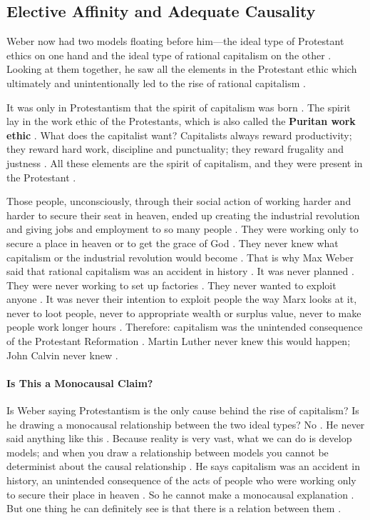 \subsection{Elective Affinity and Adequate Causality}
Weber now had two models floating before him---the ideal type of Protestant ethics on one hand and the ideal type of rational capitalism on the other . Looking at them together, he saw all the elements in the Protestant ethic which ultimately and unintentionally led to the rise of rational capitalism .

It was only in Protestantism that the spirit of capitalism was born . The spirit lay in the work ethic of the Protestants, which is also called the \textbf{Puritan work ethic} .
What does the capitalist want? Capitalists always reward productivity; they reward hard work, discipline and punctuality; they reward frugality and justness . All these elements are the spirit of capitalism, and they were present in the Protestant .

\begin{KeyConcept}
Those people, unconsciously, through their social action of working harder and harder to secure their seat in heaven, ended up creating the industrial revolution and giving jobs and employment to so many people .
They were working only to secure a place in heaven or to get the grace of God . They never knew what capitalism or the industrial revolution would become .
That is why Max Weber said that rational capitalism was an accident in history . It was never planned . They were never working to set up factories .
They never wanted to exploit anyone . It was never their intention to exploit people the way Marx looks at it, never to loot people, never to appropriate wealth or surplus value, never to make people work longer hours .
Therefore: capitalism was the unintended consequence of the Protestant Reformation . Martin Luther never knew this would happen; John Calvin never knew .
\end{KeyConcept}

\paragraph{Is This a Monocausal Claim?}
Is Weber saying Protestantism is the only cause behind the rise of capitalism? Is he drawing a monocausal relationship between the two ideal types? No . He never said anything like this .
Because reality is very vast, what we can do is develop models; and when you draw a relationship between models you cannot be determinist about the causal relationship .
He says capitalism was an accident in history, an unintended consequence of the acts of people who were working only to secure their place in heaven . So he cannot make a monocausal explanation . But one thing he can definitely see is that there is a relation between them .


